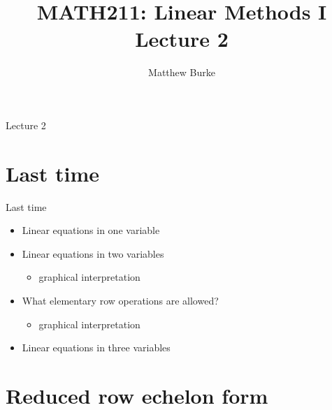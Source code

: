 \documentclass{beamer}
\title{MATH211: Linear Methods I\\Lecture 2}
\author{Matthew Burke}
\date{\formatdate{11}{09}{2018}}
\begin{document}
\frame{\titlepage}

\begin{frame}{Lecture 2}
  \tableofcontents
\end{frame}

\section{Last time}
\label{sec:Last-time}

\begin{frame}{Last time}
  \begin{itemize}
  \item Linear equations in one variable\vfill
  \item Linear equations in two variables
    \begin{itemize}
    \item graphical interpretation
    \end{itemize}\vfill
  \item What elementary row operations are allowed?
    \begin{itemize}
    \item graphical interpretation
    \end{itemize}\vfill
  \item Linear equations in three variables\vfill
  \end{itemize}
\end{frame}

\section{Reduced row echelon form}
\label{sec:Reduced-row-echelon-form}
\end{document}
